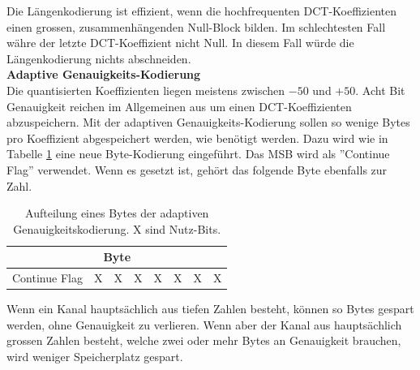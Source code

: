 Die Längenkodierung ist effizient, wenn die hochfrequenten DCT-Koeffizienten einen grossen, zusammenhängenden Null-Block bilden. Im schlechtesten Fall währe der letzte DCT-Koeffizient nicht Null. In diesem Fall würde die Längenkodierung nichts abschneiden.\\

\textbf{Adaptive Genauigkeits-Kodierung}\\
Die quantisierten Koeffizienten liegen meistens zwischen $-50$ und $+50$. Acht Bit Genauigkeit reichen im Allgemeinen aus um einen DCT-Koeffizienten abzuspeichern. Mit der adaptiven Genauigkeits-Kodierung sollen so wenige Bytes pro Koeffizient abgespeichert werden, wie benötigt werden. Dazu wird wie in Tabelle \ref{konzept:loesung1:entropie:adaptive} eine neue Byte-Kodierung eingeführt. Das MSB wird als ''Continue Flag'' verwendet. Wenn es gesetzt ist, gehört das folgende Byte ebenfalls zur Zahl.\\
\begin{table}[!htbp]
	\center
	\begin{tabular}{|c|c|c|c||c|c|c|c|}
	\hline
	\multicolumn{8}{|c|}{Byte}\\\hline
	Continue Flag & X & X & X & X & X & X & X \\\hline
	\end{tabular}
	\caption{Aufteilung eines Bytes der adaptiven Genauigkeitskodierung. X sind Nutz-Bits.}
	\label{konzept:loesung1:entropie:adaptive}
\end{table}
Wenn ein Kanal hauptsächlich aus tiefen Zahlen besteht, können so Bytes gespart werden, ohne Genauigkeit zu verlieren. Wenn aber der Kanal aus hauptsächlich grossen Zahlen besteht, welche zwei oder mehr Bytes an Genauigkeit brauchen, wird weniger Speicherplatz gespart.

\pagebreak

